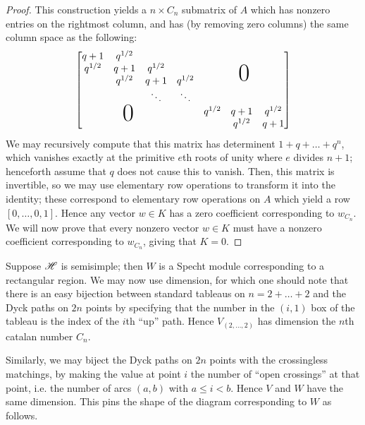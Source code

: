\documentclass{amsart}
\begin{document}
\begin{proof}
 This construction yields a $n \times C_n$ submatrix of $A$ which has nonzero entries on the rightmost column, and has (by removing zero columns) the same column space as the following:
  \newcommand*\bigzero{\makebox(0,15){\text{\Huge0}}}
  \newcommand*\bigzerotwo{\makebox(-20,15){\text{\Huge0}}}
  \[
    \begin{bmatrix}
      \begin{matrix}
      q + 1 & q^{1/2} & \\
      q^{1/2} & q + 1 & q^{1/2}\\
      & q^{1/2} & q + 1 & q^{1/2}\\
      &  & \ddots & \ddots
      \end{matrix}
      &   \bigzero\\
      \bigzerotwo & \begin{matrix}
        q^{1/2} & q+1 & q^{1/2}\\
        &  q^{1/2} & q + 1
       \end{matrix}
    \end{bmatrix}
  \]
  We may recursively compute that this matrix has determinent $1 + q + \dots + q^n$, which vanishes exactly at the primitive $e$th roots of unity where $e$ divides $n + 1$;
  henceforth assume that $q$ does not cause this to vanish.
  Then, this matrix is invertible, so we may use elementary row operations to transform it into the identity;
  these correspond to elementary row operations on $A$ which yield a row $[0,\dots,0,1]$.
  Hence any vector $w \in K$ has a zero coefficient corresponding to $w_{C_n}$.
  We will now prove that every nonzero vector $w \in K$ must have a nonzero coefficient corresponding to $w_{C_n}$, giving that $K = 0$. 
\end{proof}

Suppose $\mathscr{H}$ is semisimple;
then $W$ is a Specht module corresponding to a rectangular region.
We may now use dimension, for which one should note that there is an easy bijection between standard tableaus on $n = 2 + \dots + 2$ and the Dyck paths on $2n$ points by specifying that the number in the $(i,1)$ box of the tableau is the index of the $i$th ``up'' path.
Hence $V_{(2,\dots,2)}$ has dimension the $n$th catalan number $C_n$.

Similarly, we may biject the Dyck paths on $2n$ points with the crossingless matchings, by making the value at point $i$ the number of ``open crossings'' at that point, i.e. the number of arcs $(a,b)$ with $a \leq i < b$.
Hence $V$ and $W$ have the same dimension.
This pins the shape of the diagram corresponding to $W$ as follows.
\end{document}
